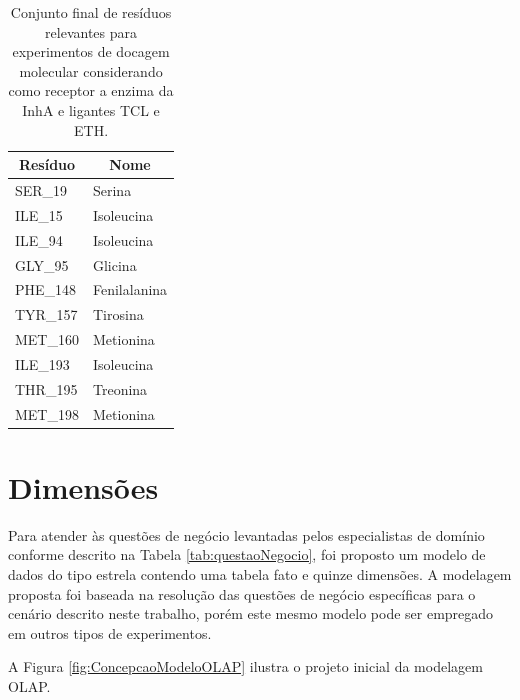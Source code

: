 \begin{itemize}
\begin{table}[h]
\caption{Conjunto final de resíduos relevantes para experimentos de docagem molecular considerando como receptor a enzima da InhA e ligantes TCL e ETH.}
\label{tab:listaProvavelRelevantes}
\centering
\begin{tabular}{@{}ll@{}}
\toprule
\multicolumn{1}{c}{Resíduo} & \multicolumn{1}{c}{Nome} \\ \midrule
SER\_19                     & Serina                   \\
ILE\_15                     & Isoleucina               \\
ILE\_94                     & Isoleucina               \\
GLY\_95                     & Glicina                  \\
PHE\_148                    & Fenilalanina             \\
TYR\_157                    & Tirosina                 \\
MET\_160                    & Metionina                \\
ILE\_193                    & Isoleucina               \\
THR\_195                    & Treonina                 \\
MET\_198                    & Metionina                \\ \bottomrule
\end{tabular}
\end{table}

\section{Dimensões}
\label{sec:Dimensoes}

Para atender às questões de negócio levantadas pelos especialistas de domínio conforme descrito na Tabela \ref{tab:questaoNegocio}, foi proposto um modelo de dados do tipo estrela contendo uma tabela fato e quinze dimensões. A modelagem proposta foi baseada na resolução das questões de negócio específicas para o cenário descrito neste trabalho, porém este mesmo modelo pode ser empregado em outros tipos de experimentos.

A Figura \ref{fig:ConcepcaoModeloOLAP} ilustra o projeto inicial da modelagem OLAP.


\end{itemize}
